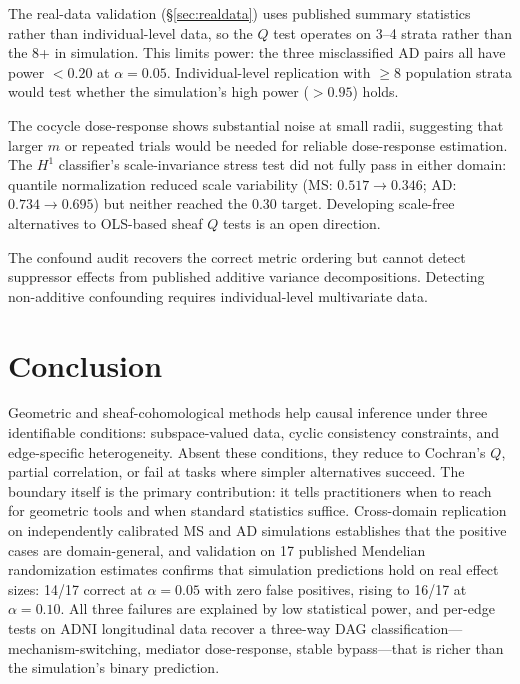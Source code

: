 \documentclass{article}
\begin{document}
The real-data validation (\S\ref{sec:realdata}) uses published summary statistics rather than individual-level data, so the $Q$ test operates on 3--4 strata rather than the 8+ in simulation.
This limits power: the three misclassified AD pairs all have power $< 0.20$ at $\alpha = 0.05$.
Individual-level replication with $\geq 8$ population strata would test whether the simulation's high power ($> 0.95$) holds.

The cocycle dose-response shows substantial noise at small radii, suggesting that larger $m$ or repeated trials would be needed for reliable dose-response estimation.
The $H^1$ classifier's scale-invariance stress test did not fully pass in either domain: quantile normalization reduced scale variability (MS: $0.517 \to 0.346$; AD: $0.734 \to 0.695$) but neither reached the $0.30$ target.
Developing scale-free alternatives to OLS-based sheaf $Q$ tests is an open direction.

The confound audit recovers the correct metric ordering but cannot detect suppressor effects from published additive variance decompositions.
Detecting non-additive confounding requires individual-level multivariate data.

\section{Conclusion}
\label{sec:conclusion}

Geometric and sheaf-cohomological methods help causal inference under three identifiable conditions: subspace-valued data, cyclic consistency constraints, and edge-specific heterogeneity.
Absent these conditions, they reduce to Cochran's $Q$, partial correlation, or fail at tasks where simpler alternatives succeed.
The boundary itself is the primary contribution: it tells practitioners when to reach for geometric tools and when standard statistics suffice.
Cross-domain replication on independently calibrated MS and AD simulations establishes that the positive cases are domain-general, and validation on 17 published Mendelian randomization estimates confirms that simulation predictions hold on real effect sizes: 14/17 correct at $\alpha = 0.05$ with zero false positives, rising to 16/17 at $\alpha = 0.10$.
All three failures are explained by low statistical power, and per-edge tests on ADNI longitudinal data recover a three-way DAG classification---mechanism-switching, mediator dose-response, stable bypass---that is richer than the simulation's binary prediction.
\end{document}
